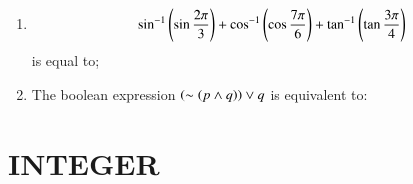 \documentclass[journal]{IEEEtran}
\numberwithin{equation}{enumi}
\numberwithin{figure}{enumi}
\begin{document}
\begin{enumerate}
    \item 
    \begin{align*}
        \sin^{-1}{\left(\sin{\frac{2\pi}{3}}\right)} + \cos^{-1}{\left(\cos{\frac{7\pi}{6}}\right)} + \tan^{-1}{\left(\tan{\frac{3\pi}{4}}\right)}
    \end{align*}
    is equal to;

    \hfill{}
    
    \begin{enumerate}
    \end{enumerate}

    \item 
    The boolean expression $\left( \sim \left(p \land q\right)\right) \lor q$ is equivalent to: 

    \hfill{}
    
    \begin{enumerate}
    \end{enumerate}

\end{enumerate}

\section*{INTEGER}
\end{document}
